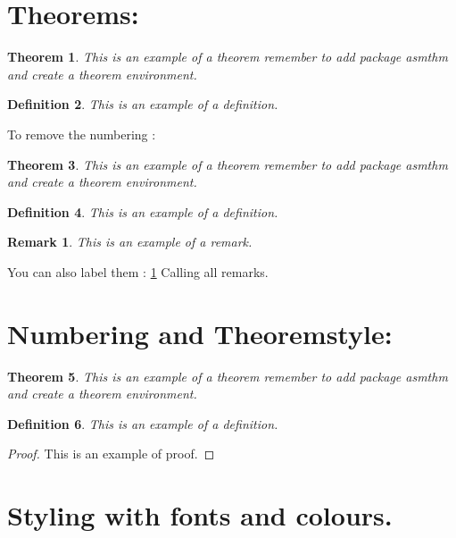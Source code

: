 \documentclass{report}
\theoremstyle{plain} %
\newtheorem{theorem}{Theorem} [section] %
\newtheorem{definition}[theorem]{Definition} %
\newtheorem*{remark}{Remark} %
\begin{document}
\section{Theorems: }

\begin{theorem}
    This is an example of a theorem remember to add package {asmthm} and create a theorem environment.
\end{theorem}

\begin{definition}
    This is an example of a definition.
\end{definition}

To remove the numbering : 

\begin{theorem}
    This is an example of a theorem remember to add package {asmthm} and create a theorem environment.
\end{theorem}

\begin{definition}
    This is an example of a definition.
\end{definition}


\begin{remark} \label{remark}
    This is an example of a remark.
\end{remark}


You can also label them : 
\ref{remark} Calling all remarks.


\section{Numbering and Theoremstyle:}

\begin{theorem}
    This is an example of a theorem remember to add package {asmthm} and create a theorem environment.
\end{theorem}

\begin{definition}
    This is an example of a definition.
\end{definition}

\begin{proof}
This is an example of proof.
\end{proof}

\newpage
\section{Styling with fonts and colours.}
\end{document}
